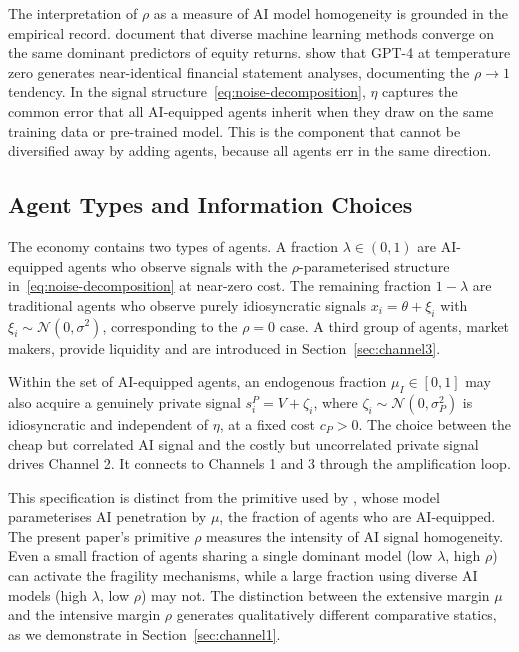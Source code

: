 The interpretation of $\rho$ as a measure of AI model homogeneity is grounded in the empirical record. \citet{gu2020} document that diverse machine learning methods converge on the same dominant predictors of equity returns. \citet{kim2024} show that GPT-4 at temperature zero generates near-identical financial statement analyses, documenting the $\rho \to 1$ tendency. In the signal structure~\eqref{eq:noise-decomposition}, $\eta$ captures the common error that all AI-equipped agents inherit when they draw on the same training data or pre-trained model. This is the component that cannot be diversified away by adding agents, because all agents err in the same direction.

\subsection{Agent Types and Information Choices}
\label{sec:model-agents}

The economy contains two types of agents. A fraction $\lambda \in (0,1)$ are AI-equipped agents who observe signals with the $\rho$-parameterised structure in~\eqref{eq:noise-decomposition} at near-zero cost. The remaining fraction $1-\lambda$ are traditional agents who observe purely idiosyncratic signals $x_i = \theta + \xi_i$ with $\xi_i \sim \mathcal{N}(0,\sigma^2)$, corresponding to the $\rho = 0$ case. A third group of agents, market makers, provide liquidity and are introduced in Section~\ref{sec:channel3}.

Within the set of AI-equipped agents, an endogenous fraction $\mu_I \in [0,1]$ may also acquire a genuinely private signal $s_i^P = V + \zeta_i$, where $\zeta_i \sim \mathcal{N}(0,\sigma_P^2)$ is idiosyncratic and independent of $\eta$, at a fixed cost $c_P > 0$. The choice between the cheap but correlated AI signal and the costly but uncorrelated private signal drives Channel 2. It connects to Channels 1 and 3 through the amplification loop.

This specification is distinct from the primitive used by \citet{danielsson2025}, whose model parameterises AI penetration by $\mu$, the fraction of agents who are AI-equipped. The present paper's primitive $\rho$ measures the intensity of AI signal homogeneity. Even a small fraction of agents sharing a single dominant model (low $\lambda$, high $\rho$) can activate the fragility mechanisms, while a large fraction using diverse AI models (high $\lambda$, low $\rho$) may not. The distinction between the extensive margin $\mu$ and the intensive margin $\rho$ generates qualitatively different comparative statics, as we demonstrate in Section~\ref{sec:channel1}.

